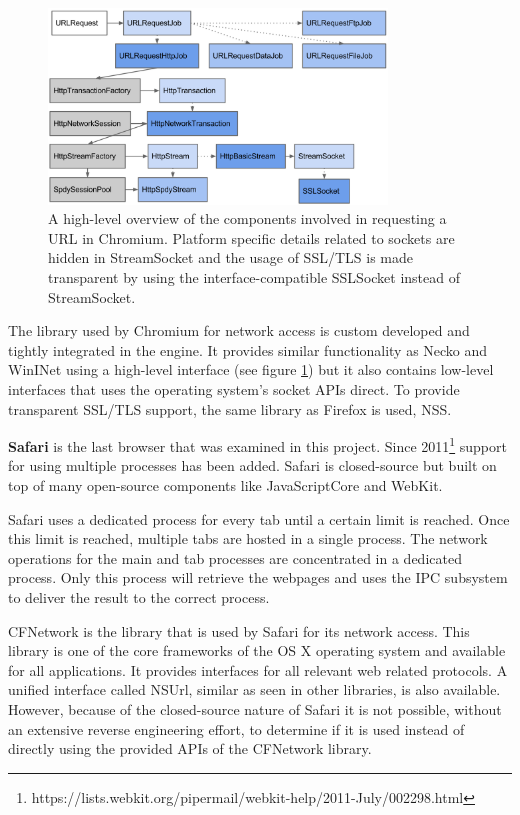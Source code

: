 \begin{figure}[h]
    \centering
    \includegraphics[width=9cm]{Images/Chrome_network.png}
    \caption{A high-level overview of the components involved in requesting a URL in Chromium. Platform specific details related to sockets are hidden in StreamSocket and the usage of SSL/TLS is made transparent by using the interface-compatible SSLSocket instead of StreamSocket. \cite{ChromeNetwork}}
    \label{fig:chrome_network}
\end{figure}

The library used by Chromium for network access is custom developed and tightly integrated in the engine. It provides similar functionality as Necko and WinINet using a high-level interface (see figure \ref{fig:chrome_network}) but it also contains low-level interfaces that uses the operating system's socket APIs direct. To provide transparent SSL/TLS support, the same library as Firefox is used, NSS.

\textbf{Safari} is the last browser that was examined in this project. Since 2011\footnote{https://lists.webkit.org/pipermail/webkit-help/2011-July/002298.html} support for using multiple processes has been added. Safari is closed-source but built on top of many open-source components like JavaScriptCore and WebKit.

Safari uses a dedicated process for every tab until a certain limit is reached. Once this limit is reached, multiple tabs are hosted in a single process. The network operations for the main and tab processes are concentrated in a dedicated process. Only this process will retrieve the webpages and uses the IPC subsystem to deliver the result to the correct process. 

CFNetwork is the library that is used by Safari for its network access. This library is one of the core frameworks of the OS X operating system and available for all applications. It provides interfaces for all relevant web related protocols. A unified interface called NSUrl, similar as seen in other libraries, is also available. However, because of the closed-source nature of Safari it is not possible, without an extensive reverse engineering effort, to determine if it is used instead of directly using the provided APIs of the CFNetwork library.

